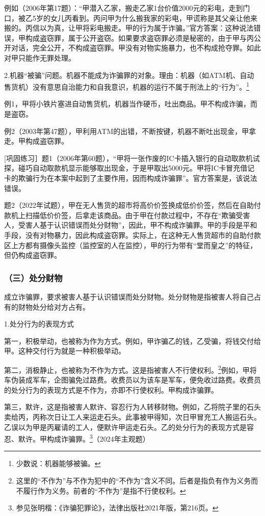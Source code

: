 例如（2006年第17题）：“甲潜入乙家，搬走乙家1台价值2000元的彩电，走到门口，被乙5岁的女儿丙看到。丙问甲为什么搬我家的彩电，甲谎称是其父亲让他来搬的。丙信以为真，让甲将彩电搬走。甲的行为属于诈骗。”官方答案：这种说法错误，甲构成盗窃罪，属于公开盗窃。如果要求盗窃罪必须是秘密的，由于甲与丙公开对话，完全公开，不构成盗窃罪。甲没有对物实施暴力，也不构成抢夺罪。如此对甲只能作无罪处理。

2.机器“被骗”问题。机器不能成为诈骗罪的对象。理由：机器（如ATM机、自动售货机）没有意思自治能力和自我意识，机器的运行不属于刑法上的“行为”。\footnote{少数说：机器能够被骗。}

例1，甲将小铁片塞进自动售货机，机器当作硬币，吐出商品。甲不构成诈骗，而是盗窃。

例2（2003年第47题），甲利用ATM的出错，不断按键，机器不断吐出现金，甲拿走。甲构成盗窃罪。

[巩固练习］题1（2006年第60题），“甲将一张作废的IC卡插入银行的自动取款机试探，碰巧自动取款机显示能够取出现金，于是甲取出5000元。甲将IC卡冒充借记卡的欺骗行为在本案中起到了主要作用，因而构成诈骗罪”。官方答案是，该说法错误。

题2（2022年试题），甲在无人售货的超市将高价价签换成低价价签，然后在自助付款机上扫描低价价签，后拿走该商品。由于甲在付款过程中，不存在“欺骗受害人，受害人基于认识错误而处分财物”，因此，甲不构成诈骗罪。甲的手段是平和手段，没有对物暴力，因此构成盗窃罪。实际上，在这种无人售货超市的自助付款区上方都有摄像头监控（监控室的人在监控），甲的行为带有“堂而皇之”的特征，但仍构成盗窃罪。

\subsubsection*{（三）处分财物}

成立诈骗罪，要求被害人基于认识错误而处分财物。处分财物是指被害人将自己占有的财物处分给对方占有。

1.处分行为的表现方式

第一，积极举动，也被称为作为方式。例如，甲诈骗乙的钱，乙受骗，将钱交付给甲。这种交付行为就是一种积极举动。

第二，消极静止，也被称为不作为方式。这是指被害人不行使权利。\footnote{这里的“不作为”与不作为犯中的“不作为”含义不同。后者是指负有作为义务而不履行作为义务。前者的“不作为”是指不行使权利。}例如，甲将车伪装成军车，企图骗免过路费。收费员以为该车是军车，便免收过路费。收费员的处分行为的表现方式是不作为，亦即不行使权利。甲构成诈骗罪。

第三，默许，这是指被害人默许、容忍行为人转移财物。例如，乙将院子里的石头卖给丙，丙称次日让工人来运走石头。此事被甲得知，次日甲冒充工人搬运石头。乙误以为甲是丙雇请的工人，便默许甲运走石头。乙的处分行为的表现方式是容忍、默许。甲构成诈骗罪。\footnote{参见张明楷：《诈骗犯罪论》，法律出版社2021年版，第216页。}（2024年主观题）

